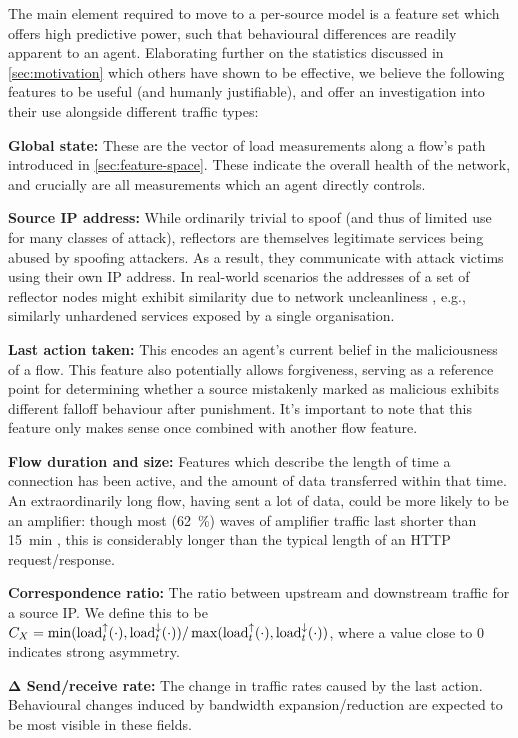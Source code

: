\documentclass[10pt, times, comsoc]{IEEEtran}
\newcommand{\fakepara}[1]{\noindent\textbf{#1:}}
\begin{document}
The main element required to move to a per-source model is a feature set which offers high predictive power, such that behavioural differences are readily apparent to an agent.
Elaborating further on the statistics discussed in \cref{sec:motivation} which others have shown to be effective, we believe the following features to be useful (and humanly justifiable), and offer an investigation into their use alongside different traffic types:

\fakepara{Global state}
These are the vector of load measurements along a flow's path introduced in \cref{sec:feature-space}.
These indicate the overall health of the network, and crucially are all measurements which an agent directly controls.

\fakepara{Source IP address}
While ordinarily trivial to spoof (and thus of limited use for many classes of attack), reflectors are themselves legitimate services being abused by spoofing attackers.
As a result, they communicate with attack victims using their own IP address.
In real-world scenarios the addresses of a set of reflector nodes might exhibit similarity due to network uncleanliness \cite{DBLP:conf/imc/CollinsSFJWSK07}, e.g., similarly unhardened services exposed by a single organisation.

\fakepara{Last action taken}
This encodes an agent's current belief in the maliciousness of a flow.
This feature also potentially allows forgiveness, serving as a reference point for determining whether a source mistakenly marked as malicious exhibits different falloff behaviour after punishment.
It's important to note that this feature only makes sense once combined with another flow feature.

\fakepara{Flow duration and size}
Features which describe the length of time a connection has been active, and the amount of data transferred within that time.
An extraordinarily long flow, having sent a lot of data, could be more likely to be an amplifier: though most (\SI{62}{\percent}) waves of amplifier traffic last shorter than \SI{15}{\minute} \cite{DBLP:conf/raid/KramerKMNKYR15}, this is considerably longer than the typical length of an HTTP request/response.

\fakepara{Correspondence ratio}
The ratio between upstream and downstream traffic for a source IP.
We define this to be $C_X = \min(\operatorname{load}^{\uparrow}_{t}(\cdot), \operatorname{load}^{\downarrow}_{t}(\cdot))/\max(\operatorname{load}^{\uparrow}_{t}(\cdot), \operatorname{load}^{\downarrow}_{t}(\cdot))$, where a value close to 0 indicates strong asymmetry.

\fakepara{$\mathbf{\Delta}$ Send/receive rate}
The change in traffic rates caused by the last action.
Behavioural changes induced by bandwidth expansion/reduction are expected to be most visible in these fields.
\end{document}
